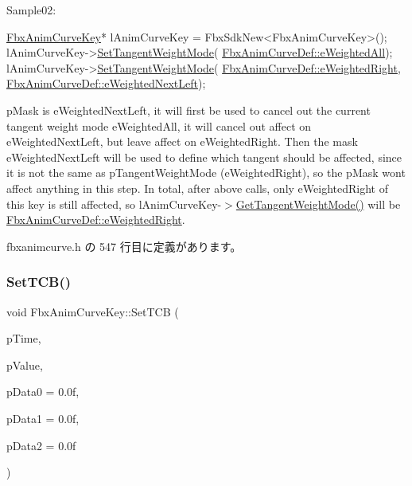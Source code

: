 Sample02\+: 
\begin{DoxyCode}
\hyperlink{class_fbx_anim_curve_key}{FbxAnimCurveKey}* lAnimCurveKey = FbxSdkNew<FbxAnimCurveKey>();
lAnimCurveKey->\hyperlink{class_fbx_anim_curve_key_a418159da0643ccdbeb5aa59b69b821e0}{SetTangentWeightMode}(
      \hyperlink{class_fbx_anim_curve_def_aeee6e9cc12501e10dbd3e5caaf66990ea4337e6853fab642c2a432ab1bb303922}{FbxAnimCurveDef::eWeightedAll});
lAnimCurveKey->\hyperlink{class_fbx_anim_curve_key_a418159da0643ccdbeb5aa59b69b821e0}{SetTangentWeightMode}(
      \hyperlink{class_fbx_anim_curve_def_aeee6e9cc12501e10dbd3e5caaf66990ea869960737022db21fc64480daa22725a}{FbxAnimCurveDef::eWeightedRight}, 
      \hyperlink{class_fbx_anim_curve_def_aeee6e9cc12501e10dbd3e5caaf66990eae28d75f955feebe5756d77ad0765d000}{FbxAnimCurveDef::eWeightedNextLeft});
\end{DoxyCode}
 p\+Mask is e\+Weighted\+Next\+Left, it will first be used to cancel out the current tangent weight mode e\+Weighted\+All, it will cancel out affect on e\+Weighted\+Next\+Left, but leave affect on e\+Weighted\+Right. Then the mask e\+Weighted\+Next\+Left will be used to define which tangent should be affected, since it is not the same as p\+Tangent\+Weight\+Mode (e\+Weighted\+Right), so the p\+Mask won\textquotesingle{}t affect anything in this step. In total, after above calls, only e\+Weighted\+Right of this key is still affected, so l\+Anim\+Curve\+Key-\/$>$\hyperlink{class_fbx_anim_curve_key_a6971443814d64229442becc934315c56}{Get\+Tangent\+Weight\+Mode()} will be \hyperlink{class_fbx_anim_curve_def_aeee6e9cc12501e10dbd3e5caaf66990ea869960737022db21fc64480daa22725a}{Fbx\+Anim\+Curve\+Def\+::e\+Weighted\+Right}. 

 fbxanimcurve.\+h の 547 行目に定義があります。

\mbox{\label{class_fbx_anim_curve_key_ace0cb6af3027da5a2ea28ac7e5f528be}} 
\subsubsection{\texorpdfstring{Set\+T\+C\+B()}{SetTCB()}}
{\footnotesize\ttfamily void Fbx\+Anim\+Curve\+Key\+::\+Set\+T\+CB (\begin{DoxyParamCaption}\item[{\hyperlink{class_fbx_time}{Fbx\+Time}}]{p\+Time,  }\item[{float}]{p\+Value,  }\item[{float}]{p\+Data0 = {\ttfamily 0.0f},  }\item[{float}]{p\+Data1 = {\ttfamily 0.0f},  }\item[{float}]{p\+Data2 = {\ttfamily 0.0f} }\end{DoxyParamCaption})\hspace{0.3cm}{\ttfamily [inline]}}

